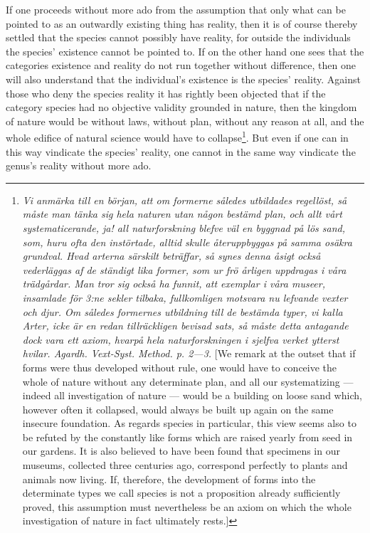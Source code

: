 \documentclass[12pt,a4paper]{book}
\begin{document}
If one proceeds without more ado from the assumption that only what can be
pointed to as an outwardly existing thing has reality, then it is of course
thereby settled that the species cannot possibly have reality, for outside the
individuals the species' existence cannot be pointed to. If on the other hand
one sees that the categories existence and reality do not run together without
difference, then one will also understand that the individual's existence is
the species' reality. Against those who deny the species reality it has rightly
been objected that if the category species had no objective validity grounded
in nature, then the kingdom of nature would be without laws, without plan,
without any reason at all, and the whole edifice of natural science would have
to collapse\footnote{\textit{Vi anmärka till en början,
att om formerne således utbildades regellöst, så måste man tänka sig hela
naturen utan någon bestämd plan, och allt vårt systematicerande, ja! all
naturforskning blefve väl en byggnad på lös sand, som, huru ofta den
instörtade, alltid skulle återuppbyggas på samma osäkra grundval. Hvad
arterna särskilt beträffar, så synes denna åsigt också vederläggas af de
ständigt lika former, som ur frö årligen uppdragas i våra trädgårdar. Man
tror sig också ha funnit, att exemplar i våra museer, insamlade för 3:ne
sekler tilbaka, fullkomligen motsvara nu lefvande vexter och djur. Om
således formernes utbildning till de bestämda typer, vi kalla Arter, icke
är en redan tillräckligen bevisad sats, så måste detta antagande dock vara
ett axiom, hvarpå hela naturforskningen i sjelfva verket ytterst hvilar.
Agardh. Vext-Syst. Method. p. 2---3.} [We remark at the outset that if forms
were thus developed without rule, one would have to conceive the whole of
nature without any determinate plan, and all our systematizing --- indeed all
investigation of nature --- would be a building on loose sand which, however
often it collapsed, would always be built up again on the same insecure
foundation. As regards species in particular, this view seems also to be
refuted by the constantly like forms which are raised yearly from seed in our
gardens. It is also believed to have been found that specimens in our museums,
collected three centuries ago, correspond perfectly to plants and animals now
living. If, therefore, the development of forms into the determinate types we
call species is not a proposition already sufficiently proved, this assumption
must nevertheless be an axiom on which the whole investigation of nature in
fact ultimately rests.]}. But
even if one can in this way vindicate the species'
reality, one cannot in the same way vindicate the genus's reality without more
ado.
\end{document}
